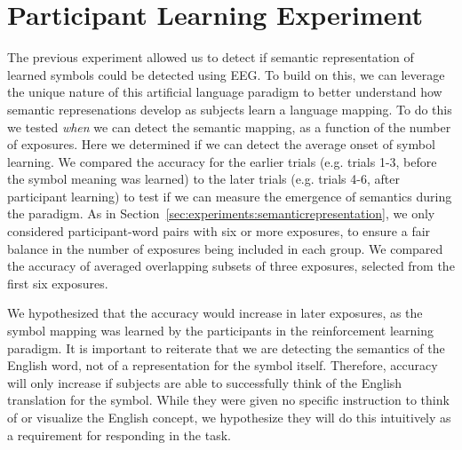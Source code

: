 \section{Participant Learning Experiment}
\label{sec:experiments:participantlearning}
The previous experiment allowed us to detect if semantic representation of 
learned symbols could be detected using EEG. To build on this, we can leverage 
the unique nature of this artificial language paradigm to better understand how 
semantic represenations develop as subjects learn a language mapping. To do 
this we tested \emph{when} we can detect the semantic mapping, as a function of 
the number of exposures.  Here we determined if we can detect the average onset 
of symbol learning. We compared the \tvt accuracy for the earlier trials (e.g.  
trials 1-3, before the symbol meaning was learned) to the later trials (e.g.  
trials 4-6, after participant learning) to test if we can measure the emergence 
of semantics during the paradigm. As in 
Section~\ref{sec:experiments:semanticrepresentation}, we only considered 
participant-word pairs with six or more exposures, to ensure a fair balance in 
the number of exposures being included in each group. We compared the \tvt 
accuracy of averaged overlapping subsets of three exposures, selected from the 
first six exposures.

We hypothesized that the \tvt accuracy would increase in later exposures, as 
the symbol mapping was learned by the participants in the reinforcement 
learning paradigm. It is important to reiterate that we are detecting the 
semantics of the English word, not of a representation for the symbol itself.  
Therefore, accuracy will only increase if subjects are able to successfully 
think of the English translation for the symbol. While they were given no 
specific instruction to think of or visualize the English concept, we 
hypothesize they will do this intuitively as a requirement for responding in 
the task.
